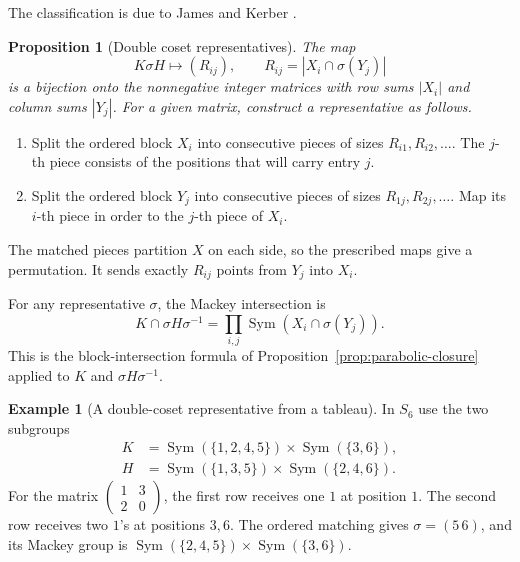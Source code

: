 \documentclass[11pt,a4paper]{article}
\numberwithin{equation}{section}
\newtheorem{proposition}[theorem]{Proposition}
\theoremstyle{definition}
\newtheorem{example}{Example}[section]
\begin{document}
The classification is due to James and Kerber \cite[Thm.~1.3.10]{james-kerber}.

\begin{proposition}[Double coset representatives]\label{prop:parabolic-double-cosets}
The map
\[
 K\sigma H\longmapsto (R_{ij}),
 \qquad R_{ij}=|X_i\cap\sigma(Y_j)|
\]
is a bijection onto the nonnegative integer matrices with row sums
\(|X_i|\) and column sums \(|Y_j|\). For a given matrix, construct
a representative as follows.
\end{proposition}

\begin{enumerate}
\item Split the ordered block \(X_i\) into consecutive pieces of sizes
\(R_{i1},R_{i2},\ldots\). The \(j\)-th piece consists of the positions
that will carry entry \(j\).
\item Split the ordered block \(Y_j\) into consecutive pieces of sizes
\(R_{1j},R_{2j},\ldots\). Map its \(i\)-th piece in order to the
\(j\)-th piece of \(X_i\).
\end{enumerate}

The matched pieces partition \(X\) on each side, so the prescribed
maps give a permutation. It sends exactly \(R_{ij}\) points from
\(Y_j\) into \(X_i\).

For any representative \(\sigma\), the Mackey intersection is
\[
 K\cap\sigma H\sigma^{-1}
   =\prod_{i,j}\operatorname{Sym}(X_i\cap\sigma(Y_j)).
\]
This is the block-intersection formula of
Proposition~\ref{prop:parabolic-closure} applied to \(K\) and
\(\sigma H\sigma^{-1}\).


\begin{example}[A double-coset representative from a tableau]\label{ex:tableau-s6}
In \(S_6\) use the two subgroups
\[
\begin{aligned}
K&=\operatorname{Sym}(\{1,2,4,5\})\times\operatorname{Sym}(\{3,6\}),\\
H&=\operatorname{Sym}(\{1,3,5\})\times\operatorname{Sym}(\{2,4,6\}).
\end{aligned}
\]
For the matrix \(\left(\begin{smallmatrix}1&3\\2&0\end{smallmatrix}\right)\),
the first row receives one \(1\) at position \(1\). The second row
receives two \(1\)'s at positions \(3,6\). The ordered matching
gives \(\sigma=(5\,6)\), and its Mackey group is
\(\operatorname{Sym}(\{2,4,5\})\times\operatorname{Sym}(\{3,6\})\).
\end{example}
\end{document}
